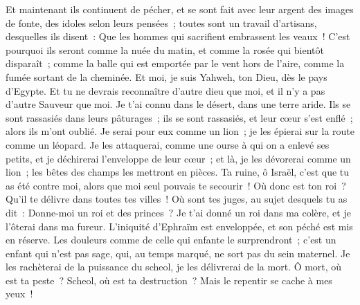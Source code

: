 \begin{multicols}{2}
Et maintenant ils continuent de pécher, et se sont fait avec leur argent des images de fonte, des idoles selon leurs pensées~; toutes sont un travail d'artisans, desquelles ils disent~: Que les hommes qui sacrifient embrassent les veaux~!
C'est pourquoi ils seront comme la nuée du matin, et comme la rosée qui bientôt disparaît~; comme la balle qui est emportée par le vent hors de l'aire, comme la fumée sortant de la cheminée.
Et moi, je suis Yahweh, ton Dieu, dès le pays d'Egypte. Et tu ne devrais reconnaître d'autre dieu que moi, et il n'y a pas d'autre Sauveur que moi.
Je t'ai connu dans le désert, dans une terre aride.
Ils se sont rassasiés dans leurs pâturages~; ils se sont rassasiés, et leur cœur s'est enflé~; alors ils m'ont oublié.
Je serai pour eux comme un lion~; je les épierai sur la route comme un léopard.
Je les attaquerai, comme une ourse à qui on a enlevé ses petits, et je déchirerai l'enveloppe de leur cœur~; et là, je les dévorerai comme un lion~; les bêtes des champs les mettront en pièces.
Ta ruine, ô Israël, c'est que tu as été contre moi, alors que moi seul pouvais te secourir~!
Où donc est ton roi~? Qu'il te délivre dans toutes tes villes~! Où sont tes juges, au sujet desquels tu as dit~: Donne-moi un roi et des princes~?
Je t'ai donné un roi dans ma colère, et je l'ôterai dans ma fureur.
L'iniquité d'Ephraïm est enveloppée, et son péché est mis en réserve.
Les douleurs comme de celle qui enfante le surprendront~; c'est un enfant qui n'est pas sage, qui, au temps marqué, ne sort pas du sein maternel.
Je les rachèterai de la puissance du scheol, je les délivrerai de la mort. Ô mort, où est ta peste~? Scheol, où est ta destruction~? Mais le repentir se cache à mes yeux~!

\end{multicols}
